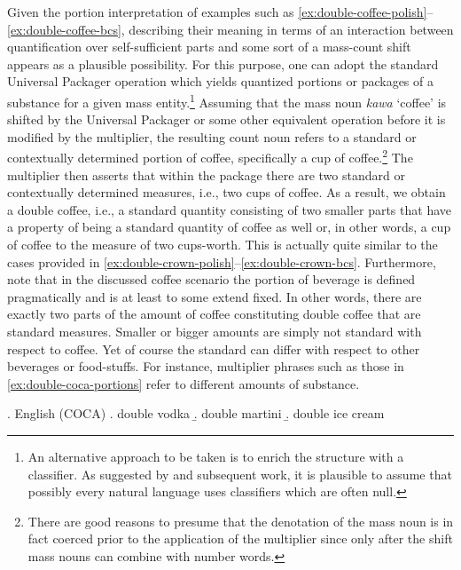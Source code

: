 Given the portion interpretation of examples such as \ref{ex:double-coffee-polish}--\ref{ex:double-coffee-bcs}, describing their meaning in terms of an interaction between quantification over self-sufficient parts and some sort of a mass-count shift appears as a plausible possibility. For this purpose, one can adopt the standard Universal Packager operation which yields quantized portions or packages of a substance for a given mass entity.\footnote{An alternative approach to be taken is to enrich the structure with a classifier. As suggested by \citet{selkirk1977some} and subsequent work, it is plausible to assume that possibly every natural language uses classifiers which are often null.} Assuming that the mass noun \textit{kawa} `coffee' is shifted by the Universal Packager or some other equivalent operation \citep[see, e.g.,][]{rothstein2011counting,khrizman_et-al2015portion,landman2016iceberg} before it is modified by the multiplier, the resulting count noun refers to a standard or contextually determined portion of coffee, specifically a cup of coffee.\footnote{There are good reasons to presume that the denotation of the mass noun is in fact coerced prior to the application of the multiplier since only after the shift mass nouns can combine with number words.} The multiplier then asserts that within the package there are two standard or contextually determined measures, i.e., two cups of coffee. As a result, we obtain a double coffee, i.e., a standard quantity consisting of two smaller parts that have a property of being a standard quantity of coffee as well or, in other words, a cup of coffee to the measure of two cups-worth. This is actually quite similar to the cases provided in \ref{ex:double-crown-polish}--\ref{ex:double-crown-bcs}. Furthermore, note that in the discussed coffee scenario the portion of beverage is defined pragmatically and is at least to some extend fixed. In other words, there are exactly two parts of the amount of coffee constituting double coffee that are standard measures. Smaller or bigger amounts are simply not standard with respect to coffee. Yet of course the standard can differ with respect to other beverages or food-stuffs. For instance, multiplier phrases such as those in \ref{ex:double-coca-portions} refer to different amounts of substance.

\ex. English (COCA)\label{ex:double-coca-portions}
\a. double vodka\label{ex:double-coca-portions-vodka}
\b. double martini\label{ex:double-coca-portions-martini}
\b. double ice cream\label{ex:double-coca-ice-cream}

